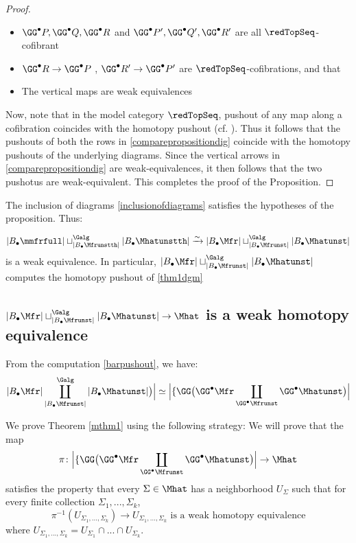 \documentclass[a4paper,10pt]{amsart}
\begin{document}
\begin{proof}
	\begin{itemize}
		\item $\GG^{\bullet}P,\GG^{\bullet}Q,\GG^{\bullet}R$ and $\GG^{\bullet}P^{\prime}, \GG^{\bullet}Q^{\prime} ,\GG^{\bullet} R^{\prime}$ are all $\redTopSeq$-cofibrant
		\item $\GG^{\bullet}R \to \GG^{\bullet}P$ , $\GG^{\bullet}R^{\prime} \to \GG^{\bullet}P^{\prime}$ are $\redTopSeq$-cofibrations, and that 
		\item The vertical maps are weak equivalences
	\end{itemize}
Now, note that in the model category $\redTopSeq$, pushout of any map along a cofibration coincides with the homotopy pushout (cf. \cite{}). Thus it follows that the pushouts of both the rows in \eqref{comparepropositiondig} coincide with the homotopy pushouts of the underlying diagrams. Since the vertical arrows in \eqref{comparepropositiondig} are weak-equivalences, it then follows that the two pushotus are weak-equivalent.	 This completes the proof of the Proposition.
	\end{proof}
	
	The inclusion of diagrams \eqref{inclusionofdiagrams} satisfies the hypotheses of the proposition. Thus:
	\begin{corollary}
	\[|B_\bullet \mmfrfull| \sqcup^{\Galg}_{|B_\bullet \Mfrunstth|}|B_\bullet \Mhatunstth| \xrightarrow{\sim} |B_\bullet \Mfr| \sqcup^{\Galg}_{|B_\bullet \Mfrunst|} |B_\bullet \Mhatunst|\]
	 is a weak equivalence. In particular, $|B_\bullet \Mfr| \sqcup^{\Galg}_{|B_\bullet \Mfrunst|} |B_\bullet \Mhatunst|$ computes the homotopy pushout of \eqref{thm1dgm}
	\end{corollary}


\subsection{$|B_\bullet \Mfr| \sqcup^{\Galg}_{|B_\bullet \Mfrunst|} |B_\bullet \Mhatunst| \to \Mhat$ is a weak homotopy equivalence}\label{finalhtpyeq}
From the computation \eqref{barpushout}, we have:
\[|B_\bullet \Mfr| \coprod_{|B_\bullet\Mfrunst|}^{\Galg}  |B_\bullet \Mhatunst|  \big)  \Big|  \simeq  \Big|\{ \GG \big(\GG^{\bullet} \Mfr \coprod_{\GG^{\bullet}\Mfrunst} \GG^{\bullet}\Mhatunst \big) \Big|\]

We prove Theorem \ref{mthm1} using the following strategy: We will prove that the map
\[ \pi \colon \Big|\{ \GG \big(\GG^{\bullet} \Mfr \coprod_{\GG^{\bullet}\Mfrunst} \GG^{\bullet}\Mhatunst \big) \Big| \to \Mhat \]
satisfies the property that every $\Sigma \in \Mhat$ has a neighborhood $U_{\Sigma}$ such that for every finite collection $\Sigma_1,...,\Sigma_k$, 
\begin{equation}
	\label{finintwheq} \pi^{-1}(U_{\Sigma_1,...,\Sigma_k}) \to U_{\Sigma_1,...,\Sigma_k} \mbox{ is a weak homotopy equivalence}
\end{equation}
where $U_{\Sigma_1,...,\Sigma_k} = U_{\Sigma_1} \cap ... \cap U_{\Sigma_k}$.
\end{document}
